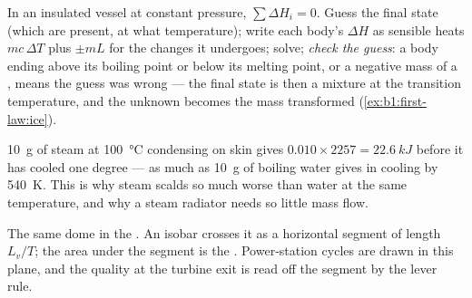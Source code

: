 \begin{method}\label{meth:b1:phase-changes:calorimetry}
In an insulated vessel at constant pressure, $\sum\Delta H_i = 0$. Guess
the final state (which  are present, at what temperature);
write each body's $\Delta H$ as sensible heats $mc\,\Delta T$ plus  $\pm mL$ for the changes it undergoes; solve; \emph{check the
guess}: a body ending above its boiling point or below its melting
point, or a negative mass of a , means the guess was wrong --- the
final state is then a mixture at the transition temperature, and the
unknown becomes the mass transformed (\cref{ex:b1:first-law:ice}).
\end{method}

\begin{example}\label{ex:b1:phase-changes:steam}
\qty{10}{g} of steam at \qty{100}{\degreeCelsius} condensing on skin gives
$0.010 \times 2257 = \qty{22.6}{kJ}$ before it has cooled one degree ---
as much as \qty{10}{g} of boiling water gives in cooling by
\qty{540}{K}. This is why steam scalds so much worse than water at the
same temperature, and why a steam radiator needs so little mass flow.
\end{example}

\begin{omfigure}

{\small The same dome in the . An isobar crosses it as
a horizontal segment of length $L_v/T$; the area under the segment is
the . Power-station cycles are drawn in this plane, and
the quality at the turbine exit is read off the segment by the lever
rule.}
\end{omfigure}

